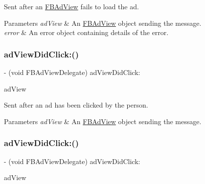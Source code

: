 Sent after an \hyperlink{interfaceFBAdView}{F\+B\+Ad\+View} fails to load the ad.


\begin{DoxyParams}{Parameters}
{\em ad\+View} & An \hyperlink{interfaceFBAdView}{F\+B\+Ad\+View} object sending the message. \\
\hline
{\em error} & An error object containing details of the error. \\
\hline
\end{DoxyParams}
\mbox{\label{protocolFBAdViewDelegate_01-p_a7842ffc41d5df660da7238e182ff634a}} 
\subsubsection{\texorpdfstring{ad\+View\+Did\+Click\+:()}{adViewDidClick:()}\hspace{0.1cm}{\footnotesize\ttfamily [1/5]}}
{\footnotesize\ttfamily -\/ (void F\+B\+Ad\+View\+Delegate) ad\+View\+Did\+Click\+: \begin{DoxyParamCaption}\item[{(\hyperlink{interfaceFBAdView}{F\+B\+Ad\+View} $\ast$)}]{ad\+View }\end{DoxyParamCaption}\hspace{0.3cm}{\ttfamily [optional]}}

Sent after an ad has been clicked by the person.


\begin{DoxyParams}{Parameters}
{\em ad\+View} & An \hyperlink{interfaceFBAdView}{F\+B\+Ad\+View} object sending the message. \\
\hline
\end{DoxyParams}
\mbox{\label{protocolFBAdViewDelegate_01-p_a7842ffc41d5df660da7238e182ff634a}} 
\subsubsection{\texorpdfstring{ad\+View\+Did\+Click\+:()}{adViewDidClick:()}\hspace{0.1cm}{\footnotesize\ttfamily [2/5]}}
{\footnotesize\ttfamily -\/ (void F\+B\+Ad\+View\+Delegate) ad\+View\+Did\+Click\+: \begin{DoxyParamCaption}\item[{(\hyperlink{interfaceFBAdView}{F\+B\+Ad\+View} $\ast$)}]{ad\+View }\end{DoxyParamCaption}\hspace{0.3cm}{\ttfamily [optional]}}

